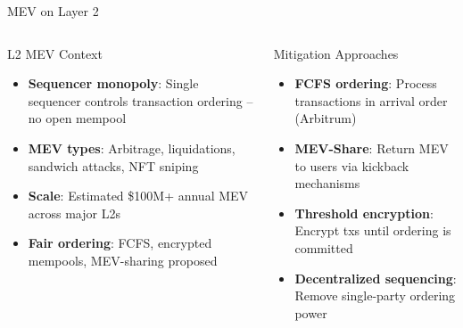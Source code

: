 \documentclass[8pt,aspectratio=169]{beamer}
\begin{document}
\begin{frame}{MEV on Layer 2}
\vspace{-1mm}
\begin{columns}[T]
\begin{block}{L2 MEV Context}
\footnotesize
\begin{itemize}\setlength\itemsep{3pt}
  \item \textbf{Sequencer monopoly}: Single sequencer controls transaction ordering -- no open mempool
  \item \textbf{MEV types}: Arbitrage, liquidations, sandwich attacks, NFT sniping
  \item \textbf{Scale}: Estimated \$100M+ annual MEV across major L2s
  \item \textbf{Fair ordering}: FCFS, encrypted mempools, MEV-sharing proposed
\end{itemize}
\end{block}
\vspace{2mm}
\begin{block}{Mitigation Approaches}
\footnotesize
\begin{itemize}
  \item \textbf{FCFS ordering}: Process transactions in arrival order (Arbitrum)
  \item \textbf{MEV-Share}: Return MEV to users via kickback mechanisms
  \item \textbf{Threshold encryption}: Encrypt txs until ordering is committed
  \item \textbf{Decentralized sequencing}: Remove single-party ordering power
\end{itemize}
\end{block}
\vspace{1mm}
\end{columns}
\end{frame}
\end{document}
